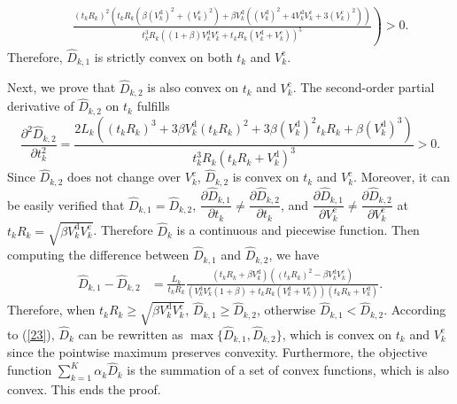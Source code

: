 \documentclass[journal,draftcls,onecolumn,12pt,twoside]{IEEEtran}
\begin{document}
\begin{appendices}
\begin{equation}
\begin{aligned}
    &~~~~\left.\frac{ \left(t_k R_k\right)^2  \left(  t_k R_k \left( \beta \left(V_k^{\text{d}}\right)^2 + \left(V_k^{\text{c}}\right)^2 \right) + \beta V_k^{\text{d}} \left( \left(V_k^{\text{d}}\right)^2 + 4V_k^{\text{d}} V_k^{\text{c}} + 3\left(V_k^{\text{c}}\right)^2   \right)\right)}   {t_k^3 R_k \left( (1+\beta) V_k^{\text{d}} V_k^{\text{c}} + t_k R_k \left( V_k^{\text{d}} + V_k^{\text{c}}\right) \right)^5} \right)>0.
	\end{aligned} \label{37}
\end{equation}
Therefore, $\widehat{D}_{k,1}$ is strictly convex on both $t_k$ and $V_k^{\text{c}}$.

Next, we prove that $\widehat{D}_{k,2}$ is also convex on $t_k$ and $V_k^{\text{c}}$. The second-order partial derivative of $\widehat{D}_{k,2}$ on $t_k$ fulfills
\begin{equation}
	\frac{\partial ^2 \widehat{D}_{k,2}}{\partial t_k^2} = \frac{2L_k\left(\left(t_k R_k\right)^3 + 3 \beta V_k^{\text{d}}\left(t_k R_k\right)^2 + 3\beta
    \left(V_k^{\text{d}}\right)^2 t_k R_k + \beta \left(V_k^{\text{d}}\right)^3\right)}{t_k^3 R_k \left(t_k R_k + V_k^{\text{d}}\right)^3}>0. \label{38}
\end{equation}
Since $\widehat{D}_{k,2}$ does not change over $V_k^{\text{c}}$, $\widehat{D}_{k,2}$ is convex on $t_k$ and $V_k^{\text{c}}$. Moreover, it can be easily verified that $\widehat{D}_{k,1}=\widehat{D}_{k,2}$, $\dfrac{\partial \widehat{D}_{k,1}}{\partial t_k}\neq \dfrac{\partial \widehat{D}_{k,2}}{\partial t_k}$, and $\dfrac{\partial \widehat{D}_{k,1}}{\partial V_k^{\text{c}}}\neq \dfrac{\partial \widehat{D}_{k,2}}{\partial V_k^{\text{c}}}$ at $t_k R_k=\sqrt{\beta V_k^{\text{d}}V_k^{\text{c}}}$. Therefore $\widehat{D}_k$ is a continuous and piecewise function. Then computing the difference between $\widehat{D}_{k,1}$ and $\widehat{D}_{k,2}$, we have
\begin{equation}
\begin{aligned}
    \widehat{D}_{k,1}-\widehat{D}_{k,2} &= \frac{L_k}{t_k R_k}\frac{\left(t_k R_k+\beta V_k^{\text{d}} \right) \left(\left(t_k R_k\right)^2-\beta V_k^{\text{d}} V_k^{\text{c}}\right)} {\left(V_k^{\text{d}}
                                            V_k^{\text{c}}(1+\beta)+t_k R_k \left(V_k^{\text{d}}+V_k^{\text{c}}\right) \right)\left(t_k R_k+V_k^{\text{d}}\right)}. \label{41}
\end{aligned}
\end{equation}
Therefore, when $t_k R_k\ge\sqrt{\beta V_k^{\text{d}}V_k^{\text{c}}}$, $\widehat{D}_{k,1} \ge \widehat{D}_{k,2}$, otherwise $\widehat{D}_{k,1} < \widehat{D}_{k,2}$. According to (\ref{23}), $\widehat{D}_k$ can be rewritten as $\max \{\widehat{D}_{k,1}, \widehat{D}_{k,2}\}$, which is convex on $t_k$ and $V_k^{\text{c}}$ since the pointwise maximum preserves convexity. Furthermore, the objective function $\sum_{k=1}^K \alpha_k \widehat{D}_k$ is the summation of a set of convex functions, which is also convex. This ends the proof.


\end{appendices}
\end{document}
